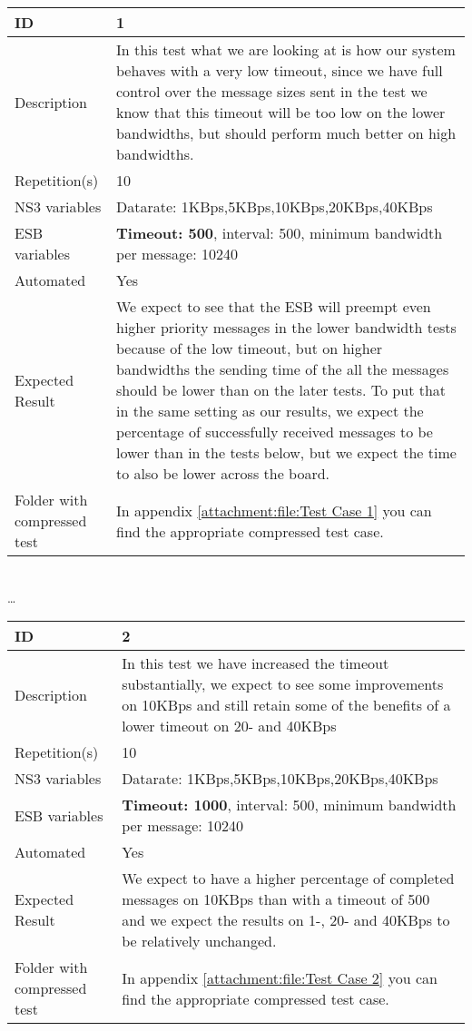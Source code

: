 \begin{center}

\begin{tabular}{| p{4cm} | p{8cm} |}%
	\hline
	ID & 1 \\
	\hline
	Description &  In this test what we are looking at is how our system behaves with a very low timeout, since we have full control over the message sizes sent in the test we know that this timeout will be too low on the lower bandwidths, but should perform much better on high bandwidths. \\
	\hline
	Repetition(s) & 10 \\
	\hline
	NS3 variables & Datarate: 1KBps,5KBps,10KBps,20KBps,40KBps \\
	\hline
	ESB variables & \textbf{Timeout: 500}, interval: 500, minimum bandwidth per message: 10240 \\
	\hline
	Automated & Yes \\
	\hline
	Expected Result & We expect to see that the ESB will preempt even higher priority messages in the lower bandwidth tests because of the low timeout, but on higher bandwidths the sending time of the all the messages should be lower than on the later tests. To put that in the same setting as our results, we expect the percentage of successfully received messages to be lower than in the tests below, but we expect the time to also be lower across the board.  \\
	\hline
	Folder with compressed test & In appendix \ref{attachment:file:Test Case 1} you can find the appropriate compressed test case.\\
	\hline
\end{tabular}

\\ \ldots \\

\begin{tabular}{| p{4cm} | p{8cm} |}%
	\hline
	ID & 2 \\
	\hline
	Description & In this test we have increased the timeout substantially, we expect to see some improvements on 10KBps and still retain some of the benefits of a lower timeout on 20- and 40KBps \\
	\hline
	Repetition(s) & 10 \\
	\hline
	NS3 variables & Datarate: 1KBps,5KBps,10KBps,20KBps,40KBps \\
	\hline
	ESB variables & \textbf{Timeout: 1000}, interval: 500, minimum bandwidth per message: 10240 \\
	\hline
	Automated & Yes \\
	\hline
	Expected Result & We expect to have a higher percentage of completed messages on 10KBps than with a timeout of 500 and we expect the results on 1-, 20- and 40KBps to be relatively unchanged. \\
	\hline
	Folder with compressed test & In appendix \ref{attachment:file:Test Case 2} you can find the appropriate compressed test case.\\
	\hline
\end{tabular}


\end{center}
